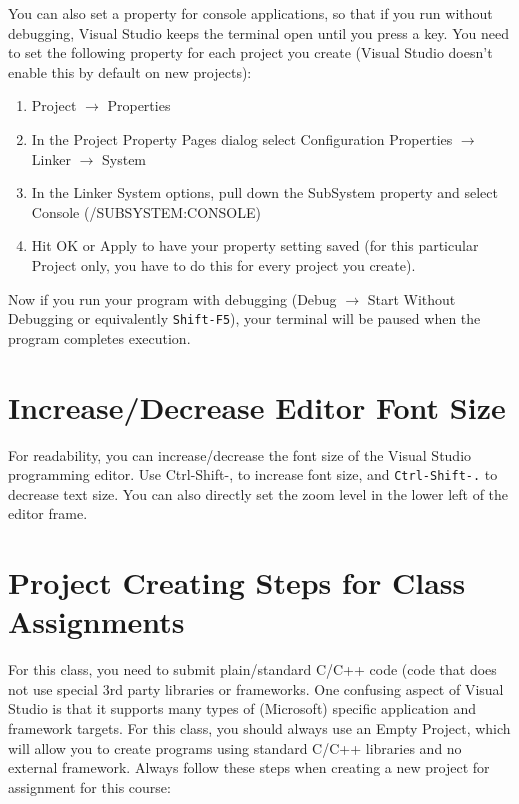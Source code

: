 \documentclass[11pt]{article}
\begin{document}
You can also set a property for console applications, so that if you
run without debugging, Visual Studio keeps the terminal open until
you press a key.  You need to set the following property for each
project you create (Visual Studio doesn't enable this by default
on new projects):

\begin{enumerate}
\item Project $\rightarrow$ Properties
\item In the Project Property Pages dialog select Configuration Properties $\rightarrow$ Linker $\rightarrow$ System
\item In the Linker System options, pull down the SubSystem property and select Console (/SUBSYSTEM:CONSOLE)
\item Hit OK or Apply to have your property setting saved (for this particular Project only, you have to do this for every project you create).
\end{enumerate}

Now if you run your program with debugging (Debug $\rightarrow$ Start
Without Debugging or equivalently \verb~Shift-F5~), your terminal will be
paused when the program completes execution.
\section{Increase/Decrease Editor Font Size}
\label{sec-5}

For readability, you can increase/decrease the font size of the Visual
Studio programming editor. Use Ctrl-Shift-, to increase font size,
and \verb~Ctrl-Shift-.~ to decrease text size.  You can also directly set
the zoom level in the lower left of the editor frame.
\section{Project Creating Steps for Class Assignments}
\label{sec-6}

For this class, you need to submit plain/standard C/C++ code (code that does not use special 3rd party libraries
or frameworks.  One confusing aspect of Visual Studio is that it supports many types of (Microsoft) specific
application and framework targets.  For this class, you should always use an Empty Project, which will allow
you to create programs using standard C/C++ libraries and no external framework.  Always follow these
steps when creating a new project for assignment for this course:
\end{document}
